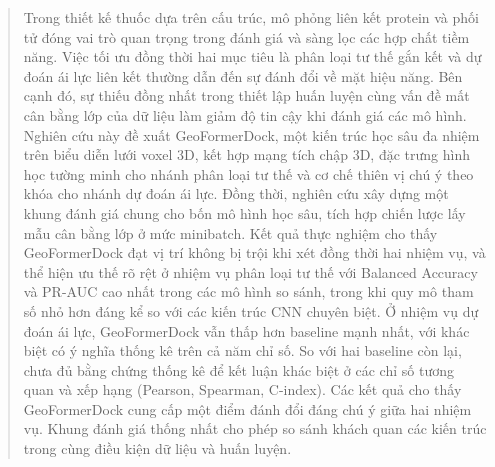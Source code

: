 \documentclass[10pt, conference, a4paper, compsocconf]{IEEEtran}
\begin{document}
%






\maketitle


\begin{abstract}
Trong thiết kế thuốc dựa trên cấu trúc, mô phỏng liên kết protein và phối tử đóng vai trò quan trọng trong đánh giá và sàng lọc các hợp chất tiềm năng. Việc tối ưu đồng thời hai mục tiêu là phân loại tư thế gắn kết và dự đoán ái lực liên kết thường dẫn đến sự đánh đổi về mặt hiệu năng. Bên cạnh đó, sự   thiếu đồng nhất trong thiết lập huấn luyện cùng vấn đề mất cân bằng lớp của dữ liệu làm giảm độ tin cậy khi đánh giá các mô hình. Nghiên cứu này đề xuất GeoFormerDock, một kiến trúc học sâu đa nhiệm trên biểu diễn lưới voxel 3D, kết hợp mạng tích chập 3D, đặc trưng hình học tường minh cho nhánh phân loại tư thế và cơ chế thiên vị chú ý theo khóa cho nhánh dự đoán ái lực. Đồng thời, nghiên cứu xây dựng một khung đánh giá chung cho bốn mô hình học sâu, tích hợp chiến lược lấy mẫu cân bằng lớp ở mức minibatch. Kết quả thực nghiệm cho thấy GeoFormerDock đạt vị trí không bị trội khi xét đồng thời hai nhiệm vụ, và thể hiện ưu thế rõ rệt ở nhiệm vụ phân loại tư thế với Balanced Accuracy và PR-AUC cao nhất trong các mô hình so sánh, trong khi quy mô tham số nhỏ hơn đáng kể so với các kiến trúc CNN chuyên biệt. Ở nhiệm vụ dự đoán ái lực, GeoFormerDock vẫn thấp hơn baseline mạnh nhất, với khác biệt có ý nghĩa thống kê trên cả năm chỉ số. So với hai baseline còn lại, chưa đủ bằng chứng thống kê để kết luận khác biệt ở các chỉ số tương quan và xếp hạng (Pearson, Spearman, C-index). Các kết quả cho thấy GeoFormerDock cung cấp một điểm đánh đổi đáng chú ý giữa hai nhiệm vụ. Khung đánh giá thống nhất cho phép so sánh khách quan các kiến trúc trong cùng điều kiện dữ liệu và huấn luyện.
\end{abstract}
\end{document}
